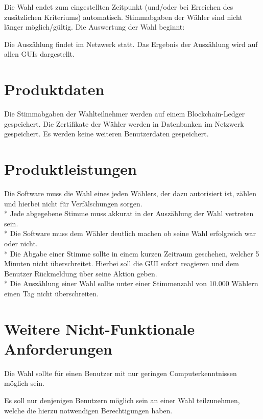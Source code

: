 \documentclass[parskip=full,11pt,twoside]{scrartcl}
\begin{document}
Die Wahl endet zum eingestellten Zeitpunkt (und/oder bei Erreichen des zusätzlichen Kriteriums) automatisch. Stimmabgaben der Wähler sind nicht länger möglich/gültig. Die Auswertung der Wahl beginnt:

Die Auszählung findet im Netzwerk statt. Das Ergebnis der Auszählung wird auf allen GUIs dargestellt.

\section{Produktdaten}

Die Stimmabgaben der Wahlteilnehmer werden auf einem Blockchain-Ledger gespeichert.
Die Zertifikate der Wähler werden in Datenbanken im Netzwerk gespeichert.
Es werden keine weiteren Benutzerdaten gespeichert.

\section{Produktleistungen}
Die Software muss die Wahl eines jeden Wählers, der dazu autorisiert ist, zählen und hierbei nicht für Verfälschungen sorgen. \\*
Jede abgegebene Stimme muss akkurat in der Auszählung der Wahl vertreten sein. \\*
Die Software muss dem Wähler deutlich machen ob seine Wahl erfolgreich war oder nicht. \\*
Die Abgabe einer Stimme sollte in einem kurzen Zeitraum geschehen, welcher 5 Minuten nicht überschreitet.
Hierbei soll die GUI sofort reagieren und dem Benutzer Rückmeldung über seine Aktion geben. \\*
Die Auszählung einer Wahl sollte unter einer Stimmenzahl von 10.000 Wählern einen Tag nicht überschreiten. 


\section{Weitere Nicht-Funktionale Anforderungen}

Die Wahl sollte für einen Benutzer mit nur geringen Computerkenntnissen möglich sein.

Es soll nur denjenigen Benutzern möglich sein an einer Wahl teilzunehmen, welche die hierzu notwendigen Berechtigungen haben.
\end{document}
